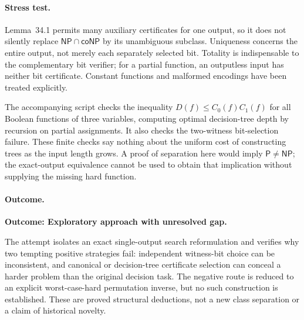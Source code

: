 \documentclass[11pt,a4paper]{article}
\numberwithin{equation}{section}
\begin{document}
\paragraph{Stress test.}
Lemma~34.1 permits many auxiliary certificates for one output, so it does not
silently replace $\mathsf{NP}\cap\mathsf{coNP}$ by its unambiguous subclass.
Uniqueness concerns the entire output, not merely each separately selected
bit. Totality is indispensable to the complementary bit verifier; for a
partial function, an outputless input has neither bit certificate. Constant
functions and malformed encodings have been treated explicitly.

The accompanying script checks the inequality $D(f)\le C_0(f)C_1(f)$ for
all Boolean functions of three variables, computing optimal decision-tree
depth by recursion on partial assignments. It also checks the two-witness
bit-selection failure. These finite checks say nothing about the uniform
cost of constructing trees as the input length grows. A proof of separation
here would imply $\mathsf P\ne\mathsf{NP}$; the exact-output equivalence
cannot be used to obtain that implication without supplying the missing
hard function.

\paragraph{Outcome.}
\textbf{Outcome: Exploratory approach with unresolved gap.}

The attempt isolates an exact single-output search reformulation and verifies
why two tempting positive strategies fail: independent witness-bit choice
can be inconsistent, and canonical or decision-tree certificate selection
can conceal a harder problem than the original decision task. The negative
route is reduced to an explicit worst-case-hard permutation inverse, but
no such construction is established. These are proved structural deductions,
not a new class separation or a claim of historical novelty.

\end{document}

